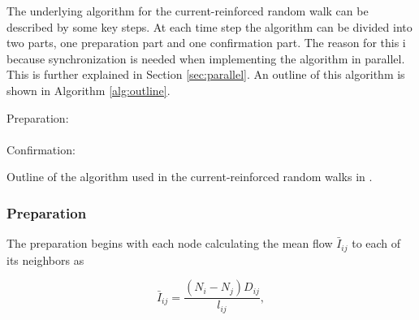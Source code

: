 The underlying algorithm for the current-reinforced random walk can be described by some key steps. At each time step the algorithm can be divided into two parts, one preparation part and one confirmation part. The reason for this i because synchronization is needed when implementing the algorithm in parallel. This is further explained in Section \ref{sec:parallel}. An outline of this algorithm is shown in Algorithm \ref{alg:outline}.

%

{
\vspace{1em}
\begin{algorithm}[H]
Preparation:\\
\ \\
Confirmation:\\
\caption{Outline of the algorithm used in the current-reinforced random walks in \cite{Sumpter}.}
\label{alg:outline}
\end{algorithm}
\vspace{1em}
}

\subsubsection{Preparation}
\label{sec:preparation}
The preparation begins with each node calculating the mean flow $\bar{I}_{ij}$ to each of its neighbors as

\begin{equation}
\bar{I}_{ij} = \frac{(N_i - N_j)D_{ij}}{l_{ij}},
\end{equation}

